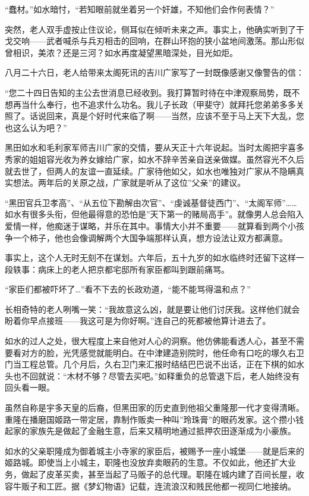 \documentclass[
]{book}
\begin{document}
``蠢材。''如水暗忖，``若知眼前就坐着另一个奸雄，不知他们会作何表情？''

突然，老人双手虚按止住议论，侧耳似在倾听未来之声。事实上，他确实听到了干戈交响------武者喊杀与兵刃相击的回响，在群山环抱的狭小盆地间激荡。那山形似曾相识，美浓？还是三河？如水再度凝望黑暗深处，目光如炬。

八月二十六日，老人给带来太阁死讯的吉川广家写了一封既像感谢又像警告的信：

``您二十四日告知的主公去世消息已经收到。我打算暂时待在中津观察局势，既不想再当什么奉行，也不追求什么功名。我儿子长政（甲斐守）就拜托您弟弟多多关照了。话说回来，真是个好时代来临了啊------当然，应该不至于马上天下大乱，您也这么认为吧？''

黑田如水和毛利家军师吉川广家的交情，要从天正十六年说起。当时太阁把宇喜多秀家的姐姐容光收为养女嫁给广家，如水不辞辛苦亲自送亲做媒。虽然容光不久后就去世了，但两人的友谊一直延续。广家待他如父，如水也唯独对广家从不隐瞒真实想法。两年后的关原之战，广家就是听从了这位''父亲''的建议。

``黑田官兵卫孝高''、``从五位下勘解由次官''、``虔诚基督徒西门''、``太阁军师''\ldots\ldots 如水有很多头衔，但他最得意的恐怕是''天下第一的赌局高手''。就像男人总会陷入爱情一样，他痴迷于谋略，并乐在其中。事情大小并不重要------就算看到两个小孩争一个柿子，他也会像调解两个大国争端那样认真，想方设法让双方都满意。

事实上，这个人无时无刻不在谋划。六年后，五十九岁的如水临终时还留下这样一段轶事：病床上的老人把京都宅邸所有家臣都叫到跟前痛骂。

``家臣们都被吓坏了\ldots{}''看不下去的长政劝道，``能不能骂得温和点？''

长相奇特的老人咧嘴一笑：``我故意这么凶，就是要让他们讨厌我。这样他们就会盼着你早点接班------我这可是为你好啊。''连自己的死都被他算计进去了。

如水的过人之处，很大程度上来自他对人心的洞察。他仿佛能看透人心，甚至不需要看对方的脸，光凭感觉就能明白。在中津建造别院时，他任命有口吃的塚久右卫门当工程总管。几个月后，久右卫门来汇报时结结巴巴说不出话，正在下棋的如水头也不回就说：``木材不够？尽管去买吧。''如释重负的总管退下后，老人始终没有回头看一眼。

虽然自称是宇多天皇的后裔，但黑田家的历史直到他祖父重隆那一代才变得清晰。重隆在播磨国姬路一带定居，靠制作贩卖一种叫''玲珠膏''的眼药发家。这个攒小钱起家的家族先是做起了金融生意，后来又精明地通过抵押农田逐渐成为小豪族。

如水的父亲职隆成为御着城主小寺家的家臣后，被赐予一座小城堡------就是后来的姬路城。即使当上小城主，职隆也没放弃卖眼药的生意。不仅如此，他还扩大业务，做起了皮革买卖，甚至当起了马贩子的总代理。职隆在城内建了百间长屋，收容牛贩子和工匠。据《梦幻物语》记载，连流浪汉和贱民他都一视同仁地接纳。
\end{document}
